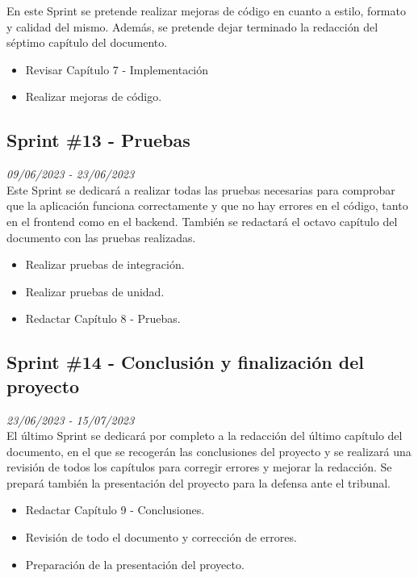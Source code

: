 En este Sprint se pretende realizar mejoras de código en cuanto a estilo, formato y calidad del mismo. Además, se pretende dejar terminado la redacción
del séptimo capítulo del documento.
\begin{itemize}
    \item Revisar Capítulo 7 - Implementación
    \item Realizar mejoras de código.
\end{itemize}

\subsection{Sprint \#13 - Pruebas }
\textit{09/06/2023   -   23/06/2023}\\

Este Sprint se dedicará a realizar todas las pruebas necesarias para comprobar que la aplicación funciona correctamente y que no hay errores en el código, tanto
en el frontend como en el backend. También se redactará el octavo capítulo del documento con las pruebas realizadas.

\begin{itemize}
    \item Realizar pruebas de integración.
    \item Realizar pruebas de unidad.
    \item Redactar Capítulo 8 - Pruebas.
\end{itemize}

\subsection{Sprint \#14 - Conclusión y finalización del proyecto}
\textit{23/06/2023   -   15/07/2023}\\

El último Sprint se dedicará por completo a la redacción del último capítulo del documento, en el que se recogerán las conclusiones del proyecto y se realizará una revisión
de todos los capítulos para corregir errores y mejorar la redacción. Se prepará también la presentación del proyecto para la defensa ante el tribunal.
\begin{itemize}
    \item Redactar Capítulo 9 - Conclusiones.
    \item Revisión de todo el documento y corrección de errores.
    \item Preparación de la presentación del proyecto.
\end{itemize}


